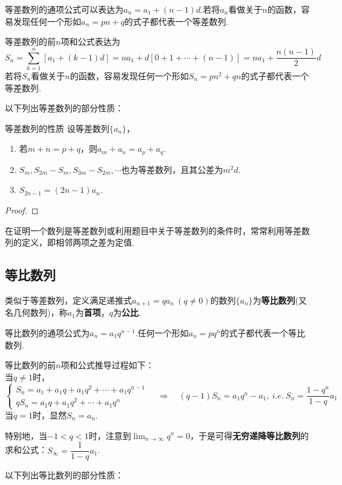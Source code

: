 \documentclass[lang=cn, zihao=5]{elegantbook}
\begin{document}
等差数列的通项公式可以表达为$a_n=a_1+(n-1)d$.若将$a_n$看做关于$n$的函数，容易发现任何一个形如$a_n=pn+q$的式子都代表一个等差数列.

等差数列的前$n$项和公式表达为$$S_n = \sum _{k=1}^{n} [a_1+(k-1)d] = na_1 + d[0+ 1 + \cdots +(n-1)] = na_1 + \frac{n(n-1)}{2}d$$
若将$S_n$看做关于$n$的函数，容易发现任何一个形如$S_n=pn^2+qn$的式子都代表一个等差数列.

以下列出等差数列的部分性质：

\begin{proposition}{等差数列的性质}
	设等差数列$\{ a_n \}$，
	\begin{enumerate}
		\item 若$m+n=p+q$，则$a_m+a_n=a_p+a_q$.
		\item $S_m,S_{2m}-S_m,S_{3m}-S_{2m},\cdots $也为等差数列，且其公差为$m^2d$.
		\item $S_{2n-1}=(2n-1)a_n$.
	\end{enumerate}
\end{proposition}
\begin{proof}
\end{proof}

在证明一个数列是等差数列或利用题目中关于等差数列的条件时，常常利用等差数列的定义，即相邻两项之差为定值.

\subsection{等比数列}

类似于等差数列，定义满足递推式$a_{n+1}=qa_n ~(q \neq 0)$的数列$\{ a_n \}$为\textbf{等比数列}(又名几何数列)，称$a_1$为\textbf{首项}，$q$为\textbf{公比}.

等比数列的通项公式为$a_n = a_1 q^{n-1}$.任何一个形如$a_n=pq^n$的式子都代表一个等比数列.

等比数列的前$n$项和公式推导过程如下： \\
当$q \neq 1$时，
$$\begin{cases}
	S_n = a_1 + a_1q + a_1q^2 + \cdots + a_1q^{n-1} \\
	qS_n = a_1q + a_1q^2 + \cdots + a_1q^{n} 
\end{cases}
\quad \Longrightarrow \quad
(q-1)S_n = a_1q^{n} - a_1,~i.e.~S_n = \frac{1-q^n}{1-q} a_1
$$
当$q = 1$时，显然$S_n = a_n$.

特别地，当$-1<q<1$时，注意到$\lim _{n \to \infty} q^n=0$，于是可得\textbf{无穷递降等比数列}的求和公式：$S_{\infty} = \dfrac{1}{1-q}a_1$.

以下列出等比数列的部分性质：
\end{document}
